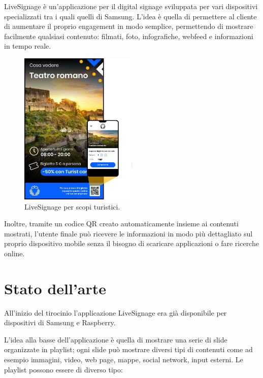 LiveSignage è un’applicazione per il digital signage sviluppata per vari dispositivi specializzati tra i quali quelli di Samsung. L’idea è quella di permettere al cliente di aumentare il proprio engagement in modo semplice, permettendo di mostrare facilmente qualsiasi contenuto: filmati, foto, infografiche, webfeed e informazioni in tempo reale.

\begin{figure}[!htb]
    \centering
    \includegraphics[width= 0.5\textwidth]{images/Introduzione/LiveTurist.jpg} 
    \caption{LiveSignage per scopi turistici.} 
\end{figure}

Inoltre, tramite un codice QR creato automaticamente insieme ai contenuti mostrati, l'utente finale può ricevere le informazioni in modo più dettagliato sul proprio dispositivo mobile senza il bisogno di scaricare applicazioni o fare ricerche online.


\section{Stato dell'arte}

All'inizio del tirocinio l'applicazione LiveSignage era già disponibile per dispositivi di Samsung e Raspberry.  

L'idea alla basse dell'applicazione è quella di mostrare una serie di slide organizzate in playlist; ogni slide può mostrare diversi tipi di contenuti come ad esempio immagini, video, web page, mappe, social network, input esterni. Le playlist possono essere di diverso tipo:

